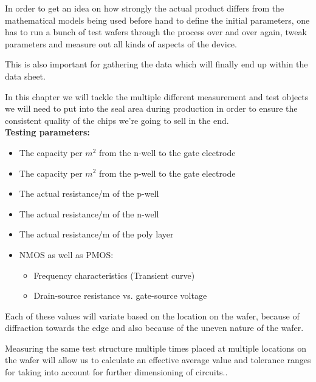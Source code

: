 In order to get an idea on how strongly the actual product differs from the mathematical models being used before hand to define the initial parameters, one has to run a bunch of test wafers through the process over and over again, tweak parameters and measure out all kinds of aspects of the device.

This is also important for gathering the data which will finally end up within the data sheet.

In this chapter we will tackle the multiple different measurement and test objects we will need to put into the seal area during production in order to ensure the consistent quality of the chips we're going to sell in the end.\\

\textbf{Testing parameters:}
\begin{itemize}
	\item The capacity per $m^2$ from the n-well to the gate electrode
	\item The capacity per $m^2$ from  the p-well to the gate electrode
	\item The actual resistance/m of the p-well
	\item The actual resistance/m of the n-well
	\item The actual resistance/m of the poly layer
	\item NMOS as well as PMOS:
	\begin{itemize}
		\item Frequency characteristics (Transient curve)
		\item Drain-source resistance vs. gate-source voltage
	\end{itemize}
\end{itemize}

Each of these values will variate based on the location on the wafer, because of diffraction towards the edge and also because of the uneven nature of the wafer.

Measuring the same test structure multiple times placed at multiple locations on the wafer will allow us to calculate an effective average value and tolerance ranges for taking into account for further dimensioning of circuits..